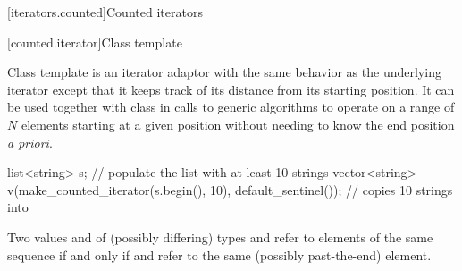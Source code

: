 [iterators.counted]{Counted iterators}

[counted.iterator]{Class template }

\pnum
Class template  is an iterator adaptor
with the same behavior as the underlying iterator except that it
keeps track of its distance from its starting position. It can be
used together with class  in calls to generic
algorithms to operate on a range of $N$ elements starting at a given
position without needing to know the end position \textit{a priori}.

\pnum
\enterexample

\begin{codeblock}
list<string> s;
// populate the list  with at least 10 strings
vector<string> v(make_counted_iterator(s.begin(), 10),
                 default_sentinel()); // copies 10 strings into 
\end{codeblock}
\exitexample

\pnum
Two values  and  of (possibly differing) types
 and  refer to
elements of the same sequence if and only if 
and  refer to the same (possibly past-the-end) element.

